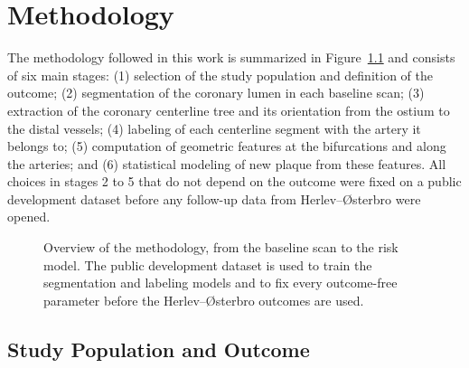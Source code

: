 %

\chapter{Methodology}
\label{ch:methodology}

The methodology followed in this work is summarized in Figure~\ref{fig:method-overview} and
consists of six main stages: (1) selection of the study population and definition of the outcome;
(2) segmentation of the coronary lumen in each baseline scan; (3) extraction of the coronary
centerline tree and its orientation from the ostium to the distal vessels; (4) labeling of each
centerline segment with the artery it belongs to; (5) computation of geometric features at the
bifurcations and along the arteries; and (6) statistical modeling of new plaque from these
features.
All choices in stages 2 to 5 that do not depend on the outcome were fixed on a public development
dataset before any follow-up data from Herlev--{\O}sterbro were opened.

\begin{figure}[htbp]
  \centering
  \caption{Overview of the methodology, from the baseline scan to the risk model. The public
    development dataset is used to train the segmentation and labeling models and to fix every
    outcome-free parameter before the Herlev--{\O}sterbro outcomes are used.}
  \label{fig:method-overview}
\end{figure}


\section{Study Population and Outcome}
\label{sec:method-population}

